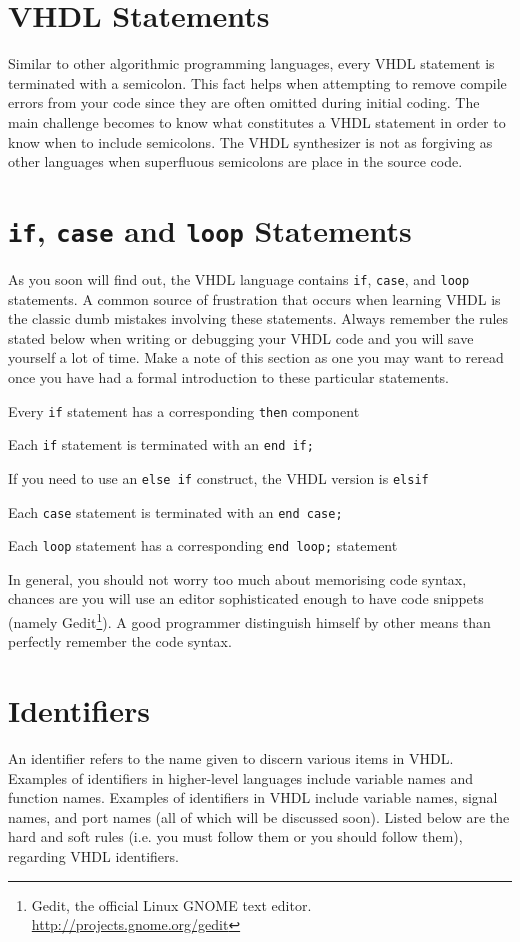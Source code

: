 \section{VHDL Statements}
Similar to other algorithmic programming languages, every VHDL statement is terminated with a semicolon. This fact helps when attempting to remove compile errors from your code since they are often omitted during initial coding. The main challenge becomes to know what constitutes a VHDL statement in order to know when to include semicolons. The VHDL synthesizer is not as forgiving as other languages when superfluous semicolons are place in the source code.

\section{\texttt{if}, \texttt{case} and \texttt{loop} Statements}
As you soon will find out, the VHDL language contains \texttt{if}, \texttt{case}, and \texttt{loop} statements. A common source of frustration that occurs when learning VHDL is the classic dumb mistakes involving these statements. Always remember the rules stated below when writing or debugging your VHDL code and you will save yourself a lot of time. Make a note of this section as one you may want to reread once you have had a formal introduction to these particular statements.
\begin{my_list}
\item Every \texttt{if} statement has a corresponding \texttt{then} component
\item Each \texttt{if} statement is terminated with an \texttt{end if;}
\item If you need to use an \texttt{else if} construct, the VHDL version is \texttt{elsif}
\item Each \texttt{case} statement is terminated with an \texttt{end case;}
\item Each \texttt{loop} statement has a corresponding \texttt{end loop;} statement
\end{my_list}
In general, you should not worry too much about memorising code syntax, chances are you will use an editor sophisticated enough to have code snippets (namely Gedit\footnote{Gedit, the official Linux GNOME text editor. \url{http://projects.gnome.org/gedit}}). A good programmer distinguish himself by other means than perfectly remember the code syntax.

\section{Identifiers}
An identifier refers to the name given to discern various items in VHDL. Examples of identifiers in higher-level languages include variable names and function names. Examples of identifiers in VHDL include variable names, signal names, and port names (all of which will be discussed soon). Listed below are the hard and soft rules (i.e. you must follow them or you should follow them), regarding VHDL identifiers.

